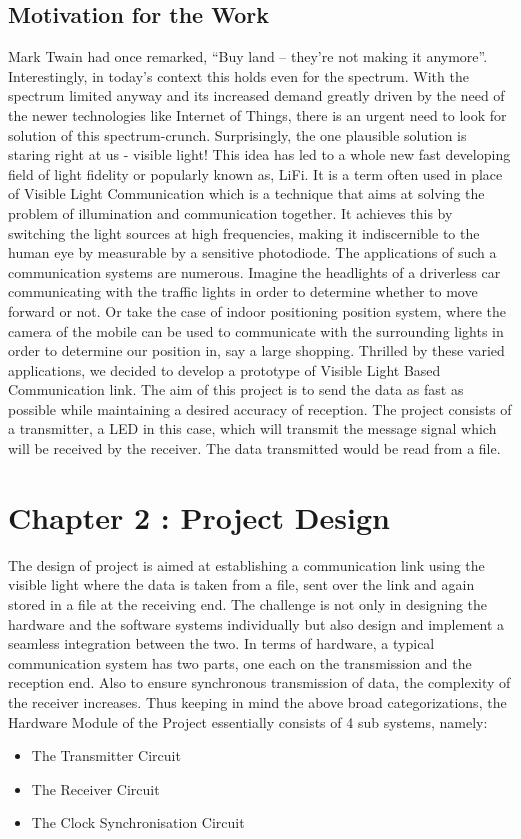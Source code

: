 \documentclass{article}
\begin{document}
\subsection{Motivation for the Work}
Mark Twain had once remarked, “Buy land -- they’re not making it anymore”. Interestingly, in today’s context this holds even for the spectrum. With the spectrum limited anyway and its increased demand greatly driven by the need of the newer technologies like Internet of Things, there is an urgent need to look for solution of this spectrum-crunch. 
Surprisingly, the one plausible solution is staring right at us - visible light! This idea has led to a whole new fast developing field of light fidelity or popularly known as, LiFi. It is a term often used in place of Visible Light Communication which is a technique that aims at solving the problem of illumination and communication together. It achieves this by switching the light sources at high frequencies, making it indiscernible to the human eye by measurable by a sensitive photodiode. The applications of such a communication systems are numerous. Imagine the headlights of a driverless car communicating with the traffic lights in order to determine whether to move forward or not. Or take the case of indoor positioning position system, where the camera of the mobile can be used to communicate with the surrounding lights in order to determine our position in, say a large shopping.    
Thrilled by these varied applications, we decided to develop a prototype of Visible Light Based Communication link. The aim of this project is to send the data as fast as possible while maintaining a desired accuracy of reception. The project consists of a transmitter, a LED in this case, which will transmit the message signal which will be received by the receiver. The data transmitted would be read from a file.

\section{Chapter 2 : Project Design}
The design of project is aimed at establishing a communication link using the visible light where the data is taken from a file, sent over the link and again stored in a file at the receiving end. The challenge is not only in designing the hardware and the software systems individually but also design and implement a seamless integration between the two. In terms of hardware, a typical communication system has two parts, one each on the transmission and the reception end. Also to ensure synchronous transmission of data, the complexity of the receiver increases. Thus keeping in mind the above broad categorizations, the Hardware Module of the Project essentially consists of 4 sub systems, namely:
\begin{itemize}
\item The Transmitter Circuit
\item The Receiver Circuit
\item The Clock Synchronisation Circuit
\end{itemize}
\end{document}

